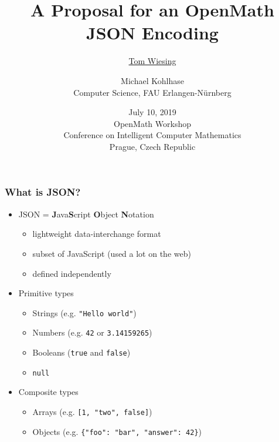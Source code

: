 \documentclass[usenames,dvipsnames]{beamer}
\makeatletter
\let\lstinline@org\lstinline
\def\lstinline{\lstinline@org[basicstyle=\ttfamily]}
\makeatother
\begin{document}
\title{A Proposal for an OpenMath JSON Encoding}
\author[Tom Wiesing et al]{\underline{Tom Wiesing}\and Michael Kohlhase\\Computer Science, FAU Erlangen-N{\"u}rnberg}
\date[July 10 2019, CICM Prague]{July 10, 2019\\OpenMath Workshop\\Conference on Intelligent Computer Mathematics\\Prague, Czech Republic}


\begin{frame}
    \titlepage
\end{frame}

\begin{frame}[fragile]
    \frametitle{What is JSON?}
    \begin{itemize}
        \item JSON = \textbf{J}ava\textbf{S}cript \textbf{O}bject \textbf{N}otation%
        \begin{itemize}
            \item lightweight data-interchange format
            \item subset of JavaScript (used a lot on the web)
            \item defined independently
        \end{itemize}
        \item Primitive types
        \begin{itemize}
                \item Strings (e.g. \lstinline{"Hello world"})
                \item Numbers (e.g. \lstinline{42} or \lstinline{3.14159265})
                \item Booleans (\lstinline{true} and \lstinline{false})
                \item \lstinline{null}
        \end{itemize}
        \item Composite types
        \begin{itemize}
            \item Arrays (e.g. \lstinline{[1, "two", false]})
            \item Objects (e.g. \lstinline|{"foo": "bar", "answer": 42}|)
        \end{itemize}
    \end{itemize}
\end{frame}
\end{document}
